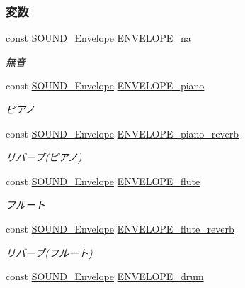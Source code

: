 \subsubsection*{変数}
\begin{DoxyCompactItemize}
\item 
const \hyperlink{sound_8h_d0/d92/structSOUND__Envelope}{S\+O\+U\+N\+D\+\_\+\+Envelope} \hyperlink{envelope_8h_a155d27ad170ccebc7a70c73de0c272fb_a155d27ad170ccebc7a70c73de0c272fb}{E\+N\+V\+E\+L\+O\+P\+E\+\_\+na}
\begin{DoxyCompactList}\small\item\em 無音 \end{DoxyCompactList}\item 
const \hyperlink{sound_8h_d0/d92/structSOUND__Envelope}{S\+O\+U\+N\+D\+\_\+\+Envelope} \hyperlink{envelope_8h_acb3b812bae69a00850c71f5327fac2e2_acb3b812bae69a00850c71f5327fac2e2}{E\+N\+V\+E\+L\+O\+P\+E\+\_\+piano}
\begin{DoxyCompactList}\small\item\em ピアノ \end{DoxyCompactList}\item 
const \hyperlink{sound_8h_d0/d92/structSOUND__Envelope}{S\+O\+U\+N\+D\+\_\+\+Envelope} \hyperlink{envelope_8h_aef7f2e51b519928969cbf6bb8efca28b_aef7f2e51b519928969cbf6bb8efca28b}{E\+N\+V\+E\+L\+O\+P\+E\+\_\+piano\+\_\+reverb}
\begin{DoxyCompactList}\small\item\em リバーブ(ピアノ) \end{DoxyCompactList}\item 
const \hyperlink{sound_8h_d0/d92/structSOUND__Envelope}{S\+O\+U\+N\+D\+\_\+\+Envelope} \hyperlink{envelope_8h_ab2df1d6cfff8d64ac4c51583e5757db0_ab2df1d6cfff8d64ac4c51583e5757db0}{E\+N\+V\+E\+L\+O\+P\+E\+\_\+flute}
\begin{DoxyCompactList}\small\item\em フルート \end{DoxyCompactList}\item 
const \hyperlink{sound_8h_d0/d92/structSOUND__Envelope}{S\+O\+U\+N\+D\+\_\+\+Envelope} \hyperlink{envelope_8h_ad5379a690b39299d142fa77bc61ad33d_ad5379a690b39299d142fa77bc61ad33d}{E\+N\+V\+E\+L\+O\+P\+E\+\_\+flute\+\_\+reverb}
\begin{DoxyCompactList}\small\item\em リバーブ(フルート) \end{DoxyCompactList}\item 
const \hyperlink{sound_8h_d0/d92/structSOUND__Envelope}{S\+O\+U\+N\+D\+\_\+\+Envelope} \hyperlink{envelope_8h_a4259b4df3aaf60a617620fd5053d4779_a4259b4df3aaf60a617620fd5053d4779}{E\+N\+V\+E\+L\+O\+P\+E\+\_\+drum}

\end{DoxyCompactItemize}
